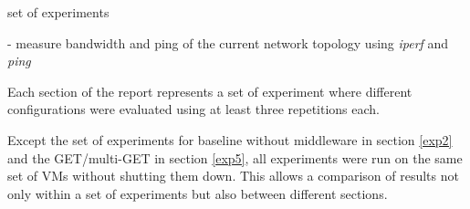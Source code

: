 \documentclass[report.tex]{subfiles}
\begin{document}
\begin{algorithm}
	\scriptsize{
	\ForEach
	{
		set of experiments
	}{
		- measure bandwidth and ping of the current network topology using \emph{iperf} and \emph{ping}
		
	}}
	\caption{Each section of the report represents a set of experiment where different configurations were evaluated using at least three repetitions each.}\label{exp-suite-algo}
\end{algorithm}

Except the set of experiments for baseline without middleware in section \ref{exp2} and the GET/multi-GET in section \ref{exp5}, all experiments were run on the same set of VMs without shutting them down. This allows a comparison of results not only within a set of experiments but also between different sections.
\end{document}
